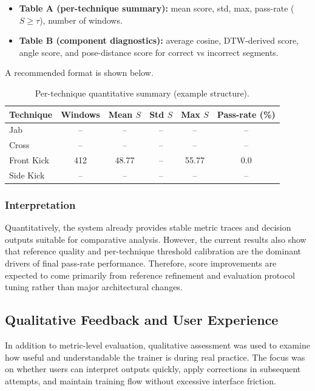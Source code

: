 \documentclass[12pt]{article}
\begin{document}
{\begin{itemize}
    \item \textbf{Table A (per-technique summary):} mean score, std, max, pass-rate (\(S \ge \tau\)), number of windows.
    \item \textbf{Table B (component diagnostics):} average cosine, DTW-derived score, angle score, and pose-distance score for correct vs incorrect segments.
\end{itemize}

A recommended format is shown below.

\begin{table}[h]
\centering
\caption{Per-technique quantitative summary (example structure).}
\begin{tabular}{lccccc}
\hline
Technique & Windows & Mean \(S\) & Std \(S\) & Max \(S\) & Pass-rate (\%) \\
\hline
Jab & -- & -- & -- & -- & -- \\
Cross & -- & -- & -- & -- & -- \\
Front Kick & 412 & 48.77 & -- & 55.77 & 0.0 \\
Side Kick & -- & -- & -- & -- & -- \\
\hline
\end{tabular}
\end{table}

\subsubsection{Interpretation}

Quantitatively, the system already provides stable metric traces and decision outputs suitable for comparative analysis. However, the current results also show that reference quality and per-technique threshold calibration are the dominant drivers of final pass-rate performance. Therefore, score improvements are expected to come primarily from reference refinement and evaluation protocol tuning rather than major architectural changes.

\subsection{Qualitative Feedback and User Experience}

In addition to metric-level evaluation, qualitative assessment was used to examine how useful and understandable the trainer is during real practice. The focus was on whether users can interpret outputs quickly, apply corrections in subsequent attempts, and maintain training flow without excessive interface friction.

}
\end{document}
